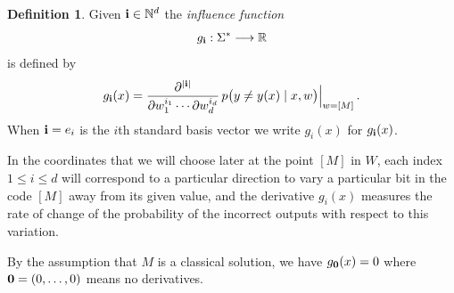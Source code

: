\documentclass[english,letter paper,12pt,reqno]{article}
\theoremstyle{definition}
\newtheorem{definition}[theorem]{Definition}
\newcommand{\lto}{\longrightarrow}
\begin{document}
\begin{definition}\label{defn:influence} Given $\bold{i} \in \mathbb{N}^d$ the \emph{influence function}
\[
g_{\bold{i}}: \Sigma^* \lto \mathbb{R}
\]
is defined by
\begin{equation}
g_{\bold{i}}(x) = \frac{\partial^{|\bold{i}|}}{\partial w_1^{i_1} \cdots \partial w_d^{i_d}}\, p\big(y \neq y(x) \mid x, w \big)\Bigr|_{w = [M]}\,.
\end{equation}
When $\bold{i} = e_i$ is the $i$th standard basis vector we write $g_i(x)$ for $g_{\bold{i}}(x)$.
\end{definition}

In the coordinates that we will choose later at the point $[M]$ in $W$, each index $1 \le i \le d$ will correspond to a particular direction to vary a particular bit in the code $[M]$ away from its given value, and the derivative $g_i(x)$ measures the rate of change of the probability of the incorrect outputs with respect to this variation.

By the assumption that $M$ is a classical solution, we have $g_{\bold{0}}(x) = 0$ where $\bold{0} = (0,\ldots,0)$ means no derivatives. 
\end{document}

